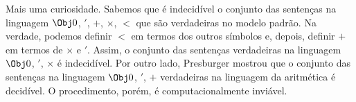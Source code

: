 \documentclass[../../../include/open-logic-section]{subfiles}
\begin{document}
Mais uma curiosidade. Sabemos que é indecidível o conjunto das sentenças na
linguagem $\Obj 0$, $'$, $+$, $\times$, $<$ que são verdadeiras no modelo
padrão. Na verdade, podemos definir $<$ em termos dos outros símbolos e,
depois, definir $+$ em termos de $\times$ e $'$. Assim, o conjunto das
sentenças verdadeiras na linguagem $\Obj 0$, $'$, $\times$ é indecidível. Por
outro lado, Presburger mostrou que o conjunto das sentenças na linguagem
$\Obj 0$, $'$, $+$ verdadeiras na linguagem da aritmética é decidível. O
procedimento, porém, é computacionalmente inviável.
\end{document}
